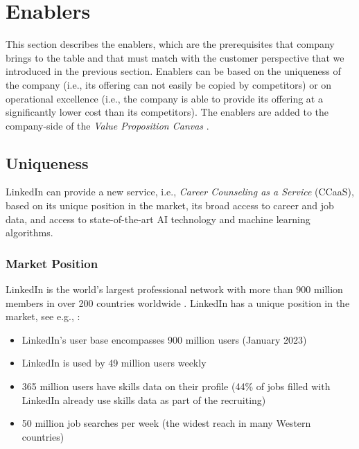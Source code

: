 \section{Enablers}
\label{sec:enablers}

This section describes the enablers, which are the prerequisites that company brings to the table and that
must match with the customer perspective that we introduced in the previous section. Enablers can be based
on the uniqueness of the company (i.e., its offering can not easily be copied by competitors) or on operational
excellence (i.e., the company is able to provide its offering at a significantly lower cost than its competitors).
The enablers are added to the company-side of the \emph{Value Proposition Canvas} \citep{osterwalderValuePropositionDesign2014}.

\subsection{Uniqueness}

LinkedIn can provide a new service, i.e., \textit{Career Counseling as a Service} (CCaaS), based on its
unique position in the market, its broad access to career and job data, and access to state-of-the-art 
AI technology and machine learning algorithms.

\subsubsection{Market Position}

LinkedIn is the world's largest professional network with more than 900 million members in over 200 countries
worldwide \citep{linkedinLinkedInPressromUs2023}. LinkedIn has a unique position in the market, see e.g.,
\cite{kaserAIpoweredCareerCounseling2023,99firmsLinkedInStatistics20232023}: 

\begin{itemize}
    \item LinkedIn's user base encompasses 900 million users (January 2023)
    \item LinkedIn is used by 49 million users weekly
    \item 365 million users have skills data on their profile (44\% of jobs filled with
        LinkedIn already use skills data as part of the recruiting)
    \item 50 million job searches per week (the widest reach in many Western countries)
\end{itemize}

